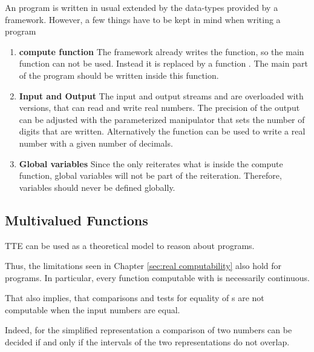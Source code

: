 		An \irram program is written in usual \cc extended by the data-types provided by a framework.
		However, a few things have to be kept in mind when writing a program
		\begin{enumerate}
      \item \textbf{compute function}
        The \irram framework already writes the \cc {} function, so
        the main function can not be used.
        Instead it is replaced by a function .
        The main part of the program should be written inside this function.
      \item \textbf{Input and Output}
        The input and output streams  and  are overloaded
        with \irram versions, that can read and write real numbers. 
        The precision of the output can be adjusted with the parameterized
        manipulator  that sets the number of digits that are
        written. 
        Alternatively the function  can be used
        to write a real number with a given number of decimals.
      \item \textbf{Global variables} Since the \irram only reiterates what is
        inside the compute function, global variables will not be part of the
        reiteration. Therefore, \real variables should never be defined
        globally.
		\end{enumerate}
	\subsection{Multivalued Functions}
		TTE can be used as a theoretical model to reason about \irram programs.

		Thus, the limitations seen in Chapter \ref{sec:real computability} also hold for \irram programs.  
		In particular, every function computable with \irram is necessarily continuous.
		
		That also implies, that comparisons and tests for equality of {\real}s are not computable when the input numbers are equal.

		Indeed, for the simplified representation a comparison of two numbers can be decided
    if and only if the intervals of the two representations do not overlap.

